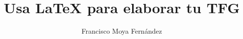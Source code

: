 \documentclass{common/eiitfg}
\title{Usa \LaTeX{} para elaborar tu TFG}
\author{Francisco Moya Fernández}
\begin{document}
\portada

	   



\indices
















\appendix


\end{document}
